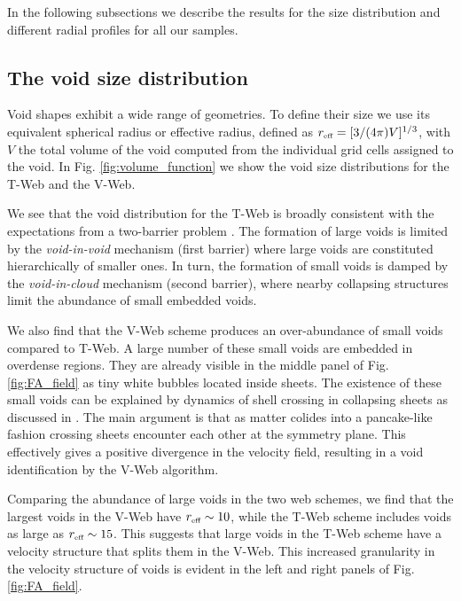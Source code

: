 \documentclass[a4,useAMS,usenatbib,usegraphicx]{mn2e}
\newcommand{\hMpc}{{\ifmmode{h^{-1}{\rm Mpc}}\else{$h^{-1}$Mpc}\fi}}
\newcommand{\reff}{{\ifmmode{r_{\mbox{\tiny eff}}}\else{$r_{\mbox{\tiny eff}}$}\fi}}
\begin{document}
In the following subsections we describe the results for the size
distribution and different radial profiles for all our samples.

\subsection{The void size distribution}
\label{subsec:shape_voids}

Void shapes exhibit a wide range of geometries.
To define their size we use its equivalent spherical radius or
effective radius, defined as $\reff = [3/(4\pi)V]^{1/3}$, with $V$ the 
total volume of the void computed from the individual grid cells
assigned to the void.   
In Fig. \ref{fig:volume_function} we show the void size
distributions for the T-Web and the V-Web.

We see that the void distribution for the T-Web is broadly consistent with the
expectations from a two-barrier problem  \citep{Sheth04}. 
The formation of large voids is limited by the \textit{void-in-void}
mechanism (first barrier) where large voids are constituted
hierarchically of smaller ones. 
In turn, the formation of small voids is damped by the
\textit{void-in-cloud} mechanism (second barrier),  where nearby
collapsing structures limit the abundance of small embedded voids.  

We also find that the V-Web scheme produces an over-abundance of small
voids compared to T-Web.
A large number of these small voids are embedded in overdense regions. 
They are already visible in the middle panel of Fig. \ref{fig:FA_field} as
tiny white bubbles located inside sheets.
The existence of these small voids can be explained by
dynamics of shell crossing in collapsing sheets as discussed in
\citet{Hoffman12}.    
The main argument is that as matter colides into a pancake-like
fashion crossing sheets encounter each other at the symmetry plane.
This effectively gives a positive divergence in the velocity
field, resulting in a void identification by the V-Web algorithm. 


Comparing the abundance of large voids in the two web schemes, we find
that the largest voids in the V-Web have $\reff \sim 10$\hMpc,
while the T-Web scheme includes voids as large as $\reff \sim 15$\hMpc. 
This suggests that large voids in the T-Web scheme have a velocity
structure that splits them in the V-Web. 
This increased granularity in the velocity structure of voids is
evident in the left and right panels of Fig. \ref{fig:FA_field}. 
\end{document}
